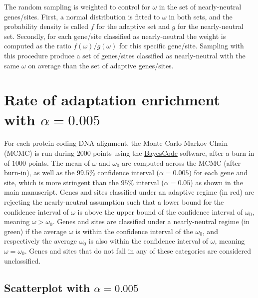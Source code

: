 \documentclass{article}
\renewcommand*{\bm}[1]{#1}%
\begin{document}
    The random sampling is weighted to control for $\omega$ in the set of nearly-neutral genes/sites.
    First, a normal distribution is fitted to $\omega$ in both sets, and the probability density is called $f$ for the adaptive set and $g$ for the nearly-neutral set.
    Secondly, for each gene/site classified as nearly-neutral the weight is computed as the ratio $f(\omega)/g(\omega)$ for this specific gene/site.
    Sampling with this procedure produce a set of genes/sites classified as nearly-neutral with the same $\omega$ on average than the set of adaptive genes/sites.

    

    \pagebreak

    \section{Rate of adaptation enrichment with $\bm{\alpha=0.005}$}
    \label{sec:threshold}
    For each protein-coding DNA alignment, the Monte-Carlo Markov-Chain (MCMC) is run during $2000$ points using the \href{https://github.com/bayesiancook/bayescode}{BayesCode} software, after a burn-in of $1000$ points.
    The mean of $\omega$ and $\omega_{0}$ are computed across the MCMC (after burn-in), as well as the $99.5$\% confidence interval ($\alpha=0.005$) for each gene and site, which is more stringent than the $95$\% interval ($\alpha=0.05$) as shown in the main manuscript.
    Genes and sites classified under an adaptive regime (in red) are rejecting the nearly-neutral assumption such that a lower bound for the confidence interval of $\omega$ is above the upper bound of the confidence interval of $\omega_{0}$, meaning $\omega > \omega_{0}$.
    Genes and sites are classified under a nearly-neutral regime (in green) if the average $\omega$ is within the confidence interval of the $\omega_{0}$, and respectively the average $\omega_{0}$ is also within the confidence interval of  $\omega$, meaning $\omega = \omega_{0}$.
    Genes and sites that do not fall in any of these categories are considered unclassified.

    \subsection{Scatterplot with $\bm{\alpha=0.005}$}
\end{document}
